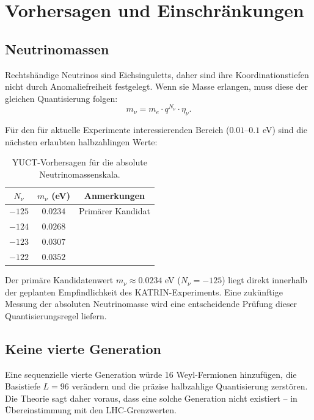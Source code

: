 \documentclass[12pt,a4paper]{article}
\begin{document}
	\section{Vorhersagen und Einschränkungen}
	
	\subsection{Neutrinomassen}
	
	Rechtshändige Neutrinos sind Eichsinguletts, daher sind ihre Koordinationstiefen nicht durch Anomaliefreiheit festgelegt. Wenn sie Masse erlangen, muss diese der gleichen Quantisierung folgen:
	\begin{equation}
		m_\nu = m_e \cdot q^{N_\nu} \cdot \eta_\nu.
	\end{equation}
	
	Für den für aktuelle Experimente interessierenden Bereich ($0.01$--$0.1$ eV) sind die nächsten erlaubten halbzahlingen Werte:
	
	\begin{table}[htbp]
		\centering
		\caption{YUCT-Vorhersagen für die absolute Neutrinomassenskala.}
		\label{tab:neutrino}
		\begin{tabular}{c c c}
			\toprule
			$N_\nu$ & $m_\nu$ (eV) & Anmerkungen \\
			\midrule
			$-125$ & $0.0234$ & Primärer Kandidat \\
			$-124$ & $0.0268$ & \\
			$-123$ & $0.0307$ & \\
			$-122$ & $0.0352$ & \\
			\bottomrule
		\end{tabular}
	\end{table}
	
	Der primäre Kandidatenwert $m_\nu \approx 0.0234$ eV ($N_\nu = -125$) liegt direkt innerhalb der geplanten Empfindlichkeit des KATRIN-Experiments. Eine zukünftige Messung der absoluten Neutrinomasse wird eine entscheidende Prüfung dieser Quantisierungsregel liefern.
	
	
	
	\subsection{Keine vierte Generation}
	
	Eine sequenzielle vierte Generation würde 16 Weyl-Fermionen hinzufügen, die Basistiefe $L=96$ verändern und die präzise halbzahlige Quantisierung zerstören. Die Theorie sagt daher voraus, dass eine solche Generation nicht existiert – in Übereinstimmung mit den LHC-Grenzwerten.
	
\end{document}
